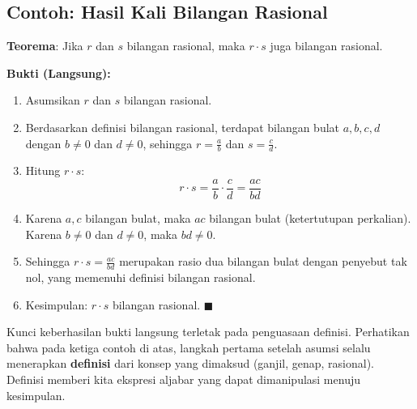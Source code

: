 \subsection{Contoh: Hasil Kali Bilangan Rasional}

\begin{contoh}
\textbf{Teorema}: Jika $r$ dan $s$ bilangan rasional, maka $r \cdot s$ juga bilangan rasional.

\textbf{Bukti (Langsung):}
\begin{enumerate}
    \item Asumsikan $r$ dan $s$ bilangan rasional.
    \item Berdasarkan definisi bilangan rasional, terdapat bilangan bulat $a, b, c, d$ dengan $b \neq 0$ dan $d \neq 0$, sehingga $r = \frac{a}{b}$ dan $s = \frac{c}{d}$.
    \item Hitung $r \cdot s$:
    \[ r \cdot s = \frac{a}{b} \cdot \frac{c}{d} = \frac{ac}{bd} \]
    \item Karena $a, c$ bilangan bulat, maka $ac$ bilangan bulat (ketertutupan perkalian). Karena $b \neq 0$ dan $d \neq 0$, maka $bd \neq 0$.
    \item Sehingga $r \cdot s = \frac{ac}{bd}$ merupakan rasio dua bilangan bulat dengan penyebut tak nol, yang memenuhi definisi bilangan rasional.
    \item Kesimpulan: $r \cdot s$ bilangan rasional. $\blacksquare$
\end{enumerate}
\end{contoh}

\begin{catatan}
Kunci keberhasilan bukti langsung terletak pada penguasaan definisi. Perhatikan bahwa pada ketiga contoh di atas, langkah pertama setelah asumsi selalu menerapkan \textbf{definisi} dari konsep yang dimaksud (ganjil, genap, rasional). Definisi memberi kita ekspresi aljabar yang dapat dimanipulasi menuju kesimpulan.
\end{catatan}
